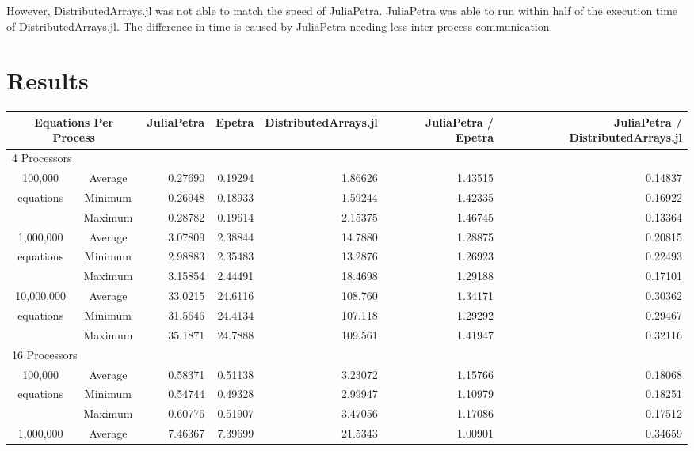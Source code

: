 \documentclass[acmsmall]{acmart}
\begin{document}
However, DistributedArrays.jl was not able to match the speed of JuliaPetra.
JuliaPetra was able to run within half of the execution time of DistributedArrays.jl.
The difference in time is caused by JuliaPetra needing less inter-process communication.

\section{Results}

\begin{table}
\begin{tabular}{|c c|r|r|r||r|r|}
	\hline
		\multicolumn{2}{|c|}{Equations Per Process}
		& JuliaPetra
		& Epetra
		& \multicolumn{1}{m{1.8cm}||}{Distributed\-Arrays.jl}
		& \multicolumn{1}{m{1.75cm}|}{JuliaPetra / Epetra}
		& \multicolumn{1}{m{1.8cm}|}{JuliaPetra / Distributed\-Arrays.jl} \\
	\hline
		\multicolumn{7}{|l|}{4 Processors}\\
	\hline
		100,000			&Average & 0.27690 & 0.19294 & 1.86626 & 1.43515 & 0.14837 \\
		equations		&Minimum & 0.26948 & 0.18933 & 1.59244 & 1.42335 & 0.16922 \\
						&Maximum & 0.28782 & 0.19614 & 2.15375 & 1.46745 & 0.13364 \\
	\hline
		1,000,000		&Average & 3.07809 & 2.38844 & 14.7880 & 1.28875 & 0.20815 \\
		equations		&Minimum & 2.98883 & 2.35483 & 13.2876 & 1.26923 & 0.22493 \\
						&Maximum & 3.15854 & 2.44491 & 18.4698 & 1.29188 & 0.17101 \\
	\hline
		10,000,000		&Average & 33.0215 & 24.6116 & 108.760 & 1.34171 & 0.30362 \\
		equations		&Minimum & 31.5646 & 24.4134 & 107.118 & 1.29292 & 0.29467 \\
						&Maximum & 35.1871 & 24.7888 & 109.561 & 1.41947 & 0.32116 \\
	\hline
		\multicolumn{7}{|l|}{16 Processors}\\
	\hline
		100,000			&Average & 0.58371 & 0.51138 & 3.23072 & 1.15766 & 0.18068 \\
		equations		&Minimum & 0.54744 & 0.49328 & 2.99947 & 1.10979 & 0.18251 \\
						&Maximum & 0.60776 & 0.51907 & 3.47056 & 1.17086 & 0.17512 \\
	\hline
		1,000,000		&Average & 7.46367 & 7.39699 & 21.5343 & 1.00901 & 0.34659 \\

\end{tabular}
\end{table}
\end{document}
